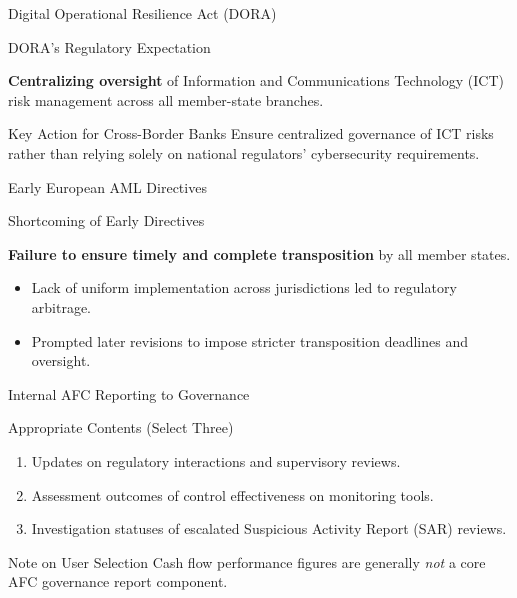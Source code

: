 \documentclass{beamer}
\begin{document}
	\begin{frame}{Digital Operational Resilience Act (DORA)}
		\begin{block}{DORA's Regulatory Expectation}
			\begin{center}
				\textbf{Centralizing oversight} of Information and Communications Technology (ICT) risk management across all member-state branches.
			\end{center}
		\end{block}
		\begin{alertblock}{Key Action for Cross-Border Banks}
			Ensure centralized governance of ICT risks rather than relying solely on national regulators' cybersecurity requirements.
		\end{alertblock}
	\end{frame}
	
	\begin{frame}{Early European AML Directives}
		\begin{block}{Shortcoming of Early Directives}
			\begin{center}
				\textbf{Failure to ensure timely and complete transposition} by all member states.
			\end{center}
		\end{block}
		\begin{itemize}
			\item Lack of uniform implementation across jurisdictions led to regulatory arbitrage.
			\item Prompted later revisions to impose stricter transposition deadlines and oversight.
		\end{itemize}
	\end{frame}
	
	\begin{frame}{Internal AFC Reporting to Governance}
		\begin{block}{Appropriate Contents (Select Three)}
			\begin{enumerate}
				\item Updates on regulatory interactions and supervisory reviews.
				\item Assessment outcomes of control effectiveness on monitoring tools.
				\item Investigation statuses of escalated Suspicious Activity Report (SAR) reviews.
			\end{enumerate}
		\end{block}
		\begin{alertblock}{Note on User Selection}
			Cash flow performance figures are generally \textit{not} a core AFC governance report component.
		\end{alertblock}
	\end{frame}
	
\end{document}
